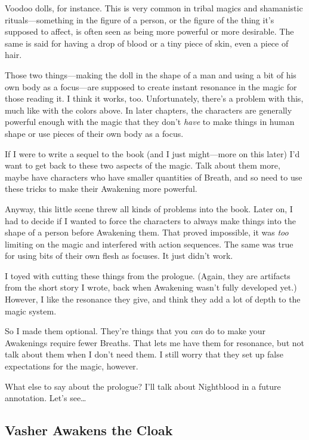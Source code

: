 Voodoo dolls, for instance. This is very common in tribal magics and shamanistic rituals—something in the figure of a person, or the figure of the thing it’s supposed to affect, is often seen as being more powerful or more desirable. The same is said for having a drop of blood or a tiny piece of skin, even a piece of hair.

Those two things—making the doll in the shape of a man and using a bit of his own body as a focus—are supposed to create instant resonance in the magic for those reading it. I think it works, too. Unfortunately, there’s a problem with this, much like with the colors above. In later chapters, the characters are generally powerful enough with the magic that they don’t \textit{have} to make things in human shape or use pieces of their own body as a focus.

If I were to write a sequel to the book (and I just might—more on this later) I’d want to get back to these two aspects of the magic. Talk about them more, maybe have characters who have smaller quantities of Breath, and so need to use these tricks to make their Awakening more powerful.

Anyway, this little scene threw all kinds of problems into the book. Later on, I had to decide if I wanted to force the characters to always make things into the shape of a person before Awakening them. That proved impossible, it was \textit{too }limiting on the magic and interfered with action sequences. The same was true for using bits of their own flesh as focuses. It just didn’t work.

I toyed with cutting these things from the prologue. (Again, they are artifacts from the short story I wrote, back when Awakening wasn’t fully developed yet.) However, I like the resonance they give, and think they add a lot of depth to the magic system.

So I made them optional. They’re things that you \textit{can} do to make your Awakenings require fewer Breaths. That lets me have them for resonance, but not talk about them when I don’t need them. I still worry that they set up false expectations for the magic, however.

\orn

What else to say about the prologue? I’ll talk about Nightblood in a future annotation. Let’s see\ldots

\subsection*{Vasher Awakens the Cloak}

